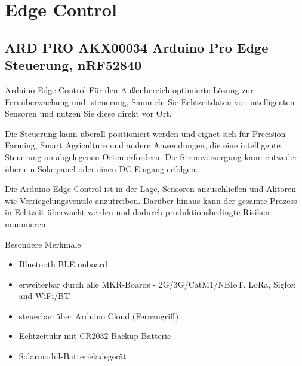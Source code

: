 %
%
%




\chapter{Edge Control}

\section{ARD PRO AKX00034 Arduino Pro Edge Steuerung, nRF52840}

Arduino Edge Control
Für den Außenbereich optimierte Lösung zur Fernüberwachung und -steuerung,
Sammeln Sie Echtzeitdaten von intelligenten Sensoren und nutzen Sie diese direkt vor Ort.

Die Steuerung kann überall positioniert werden und eignet sich für Precision Farming, Smart Agriculture und andere Anwendungen, die eine intelligente Steuerung an abgelegenen Orten erfordern. Die Stromversorgung kann entweder über ein Solarpanel oder einen DC-Eingang erfolgen.

Die Arduino Edge Control ist in der Lage, Sensoren anzuschließen und Aktoren wie Verriegelungsventile anzutreiben. Darüber hinaus kann der gesamte Prozess in Echtzeit überwacht werden und dadurch produktionsbedingte Risiken minimieren.

\bigskip

Besondere Merkmale

\begin{itemize}
  \item Bluetooth BLE onboard
  \item erweiterbar durch alle MKR-Boards - 2G/3G/CatM1/NBIoT, LoRa, Sigfox and WiFi/BT
  \item steuerbar über Arduino Cloud (Fernzugriff)
  \item Echtzeituhr mit CR2032 Backup Batterie
  \item Solarmodul-Batterieladegerät
\end{itemize}

\bigskip

